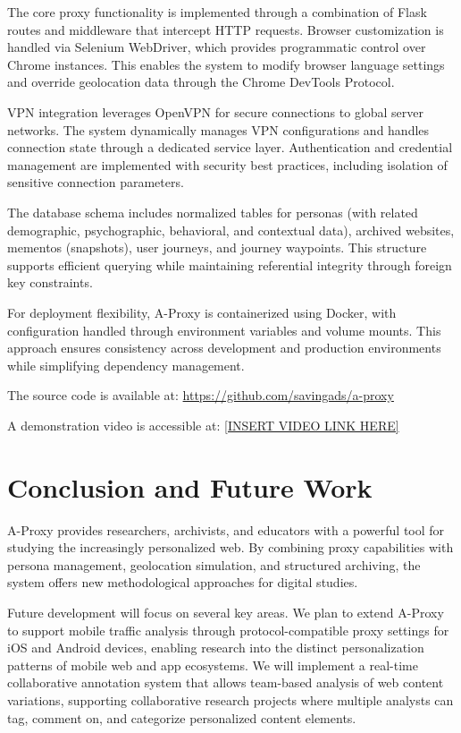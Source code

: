 \documentclass[sigconf]{acmart}
\begin{document}
The core proxy functionality is implemented through a combination of Flask routes and middleware that intercept HTTP requests. Browser customization is handled via Selenium WebDriver, which provides programmatic control over Chrome instances. This enables the system to modify browser language settings and override geolocation data through the Chrome DevTools Protocol.

VPN integration leverages OpenVPN for secure connections to global server networks. The system dynamically manages VPN configurations and handles connection state through a dedicated service layer. Authentication and credential management are implemented with security best practices, including isolation of sensitive connection parameters.

The database schema includes normalized tables for personas (with related demographic, psychographic, behavioral, and contextual data), archived websites, mementos (snapshots), user journeys, and journey waypoints. This structure supports efficient querying while maintaining referential integrity through foreign key constraints.

For deployment flexibility, A-Proxy is containerized using Docker, with configuration handled through environment variables and volume mounts. This approach ensures consistency across development and production environments while simplifying dependency management.

The source code is available at: \url{https://github.com/savingads/a-proxy}

A demonstration video is accessible at: \url{[INSERT VIDEO LINK HERE]}

\section{Conclusion and Future Work}
A-Proxy provides researchers, archivists, and educators with a powerful tool for studying the increasingly personalized web. By combining proxy capabilities with persona management, geolocation simulation, and structured archiving, the system offers new methodological approaches for digital studies.

Future development will focus on several key areas. We plan to extend A-Proxy to support mobile traffic analysis through protocol-compatible proxy settings for iOS and Android devices, enabling research into the distinct personalization patterns of mobile web and app ecosystems. We will implement a real-time collaborative annotation system that allows team-based analysis of web content variations, supporting collaborative research projects where multiple analysts can tag, comment on, and categorize personalized content elements.
\end{document}
